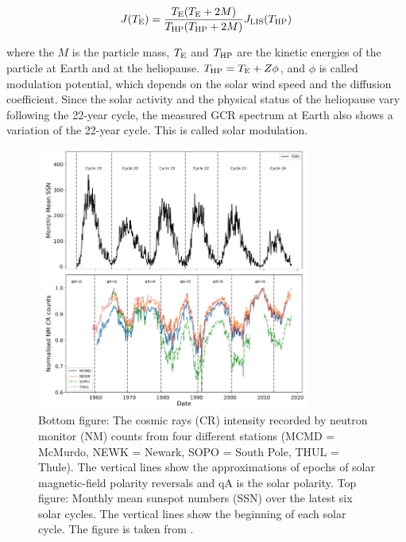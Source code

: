 \begin{equation}
J(T_{\rm{E}}) = \frac{T_{\rm{E}}(T_{\rm{E}}+2M)}{T_{\rm{HP}}(T_{\rm{HP}}+2M)} J_\mathrm{LIS}(T_{\rm{HP}})
\end{equation}

where the $M$ is the particle mass, $T_{\rm{E}}$ and $T_{\rm{HP}}$ are the kinetic energies of the particle at Earth and at the heliopause. $T_{\rm{HP}}=T_{\rm{E}} + Z \phi$, and $\phi$ is called modulation potential, which depends on the solar wind speed and the diffusion coefficient. Since the solar activity and the physical status of the heliopause vary following the 22-year cycle, the measured GCR spectrum at Earth also shows a variation of the 22-year cycle. This is called solar modulation. 

\begin{figure}[t]
\centering
\includegraphics[width=0.80\textwidth, height=0.5\textheight]{Figures/chapter2/Propagations/NeutronMonitor.png}
\caption[Cosmic rays intensity and Monthly mean sunspot numbers.]{Bottom figure: The cosmic rays (CR) intensity recorded by neutron monitor (NM) counts from four different stations (MCMD = McMurdo, NEWK = Newark, SOPO = South Pole, THUL = Thule). The vertical lines show the approximations of epochs of solar magnetic-field polarity reversals and qA is the solar polarity. Top figure: Monthly mean sunspot numbers (SSN) over the latest six solar cycles. The vertical lines show the beginning of each solar cycle. The figure is taken from \cite{NeutronMonitor}. }
\label{NeutronMonitor}
\end{figure}

